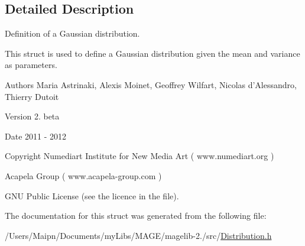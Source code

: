 \subsection{Detailed Description}
Definition of a Gaussian distribution. 

This struct is used to define a Gaussian distribution given the mean and variance as parameters.

\begin{DoxyAuthor}{Authors}
Maria Astrinaki, Alexis Moinet, Geoffrey Wilfart, Nicolas d'Alessandro, Thierry Dutoit
\end{DoxyAuthor}
\begin{DoxyVersion}{Version}
2. beta 
\end{DoxyVersion}
\begin{DoxyDate}{Date}
2011 -\/ 2012 
\end{DoxyDate}
\begin{DoxyCopyright}{Copyright}
Numediart Institute for New Media Art ( www.\-numediart.\-org ) \par
 Acapela Group ( www.\-acapela-\/group.\-com ) \par
 G\-N\-U Public License (see the licence in the file). 
\end{DoxyCopyright}


The documentation for this struct was generated from the following file\-:\begin{DoxyCompactItemize}
\item 
/\-Users/\-Maipn/\-Documents/my\-Libs/\-M\-A\-G\-E/magelib-\/2./src/\hyperlink{_distribution_8h}{Distribution.\-h}\end{DoxyCompactItemize}
